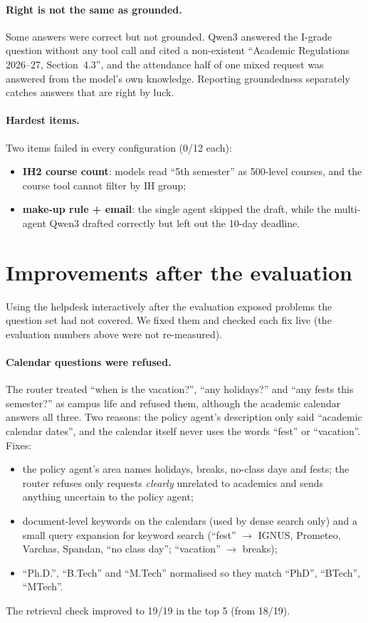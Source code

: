 \documentclass[10pt,a4paper]{article}
\begin{document}
\paragraph{Right is not the same as grounded.}
Some answers were correct but not grounded. Qwen3 answered the I-grade question without any tool call and cited a
non-existent ``Academic Regulations 2026--27, Section~4.3'', and the attendance half of one mixed request was
answered from the model's own knowledge. Reporting groundedness separately catches answers that are right by luck.

\paragraph{Hardest items.} Two items failed in every configuration (0/12 each):
\begin{itemize}
\item \textbf{IH2 course count}: models read ``5th semester'' as 500-level courses, and the course tool cannot
  filter by IH group;
\item \textbf{make-up rule + email}: the single agent skipped the draft, while the multi-agent Qwen3 drafted correctly
  but left out the 10-day deadline.
\end{itemize}

\section{Improvements after the evaluation}\label{sec:post}
Using the helpdesk interactively after the evaluation exposed problems the question set had not covered. We fixed
them and checked each fix live (the evaluation numbers above were not re-measured).

\paragraph{Calendar questions were refused.} The router treated ``when is the vacation?'', ``any holidays?'' and
``any fests this semester?'' as campus life and refused them, although the academic calendar answers all three. Two
reasons: the policy agent's description only said ``academic calendar dates'', and the calendar itself never uses
the words ``fest'' or ``vacation''. Fixes:
\begin{itemize}
\item the policy agent's area names holidays, breaks, no-class days and fests; the router refuses only requests
  \emph{clearly} unrelated to academics and sends anything uncertain to the policy agent;
\item document-level keywords on the calendars (used by dense search only) and a small query expansion for keyword
  search (``fest'' $\rightarrow$ IGNUS, Prometeo, Varchas, Spandan, ``no class day''; ``vacation'' $\rightarrow$ breaks);
\item ``Ph.D.'', ``B.Tech'' and ``M.Tech'' normalised so they match ``PhD'', ``BTech'', ``MTech''.
\end{itemize}
The retrieval check improved to 19/19 in the top 5 (from 18/19).
\end{document}
